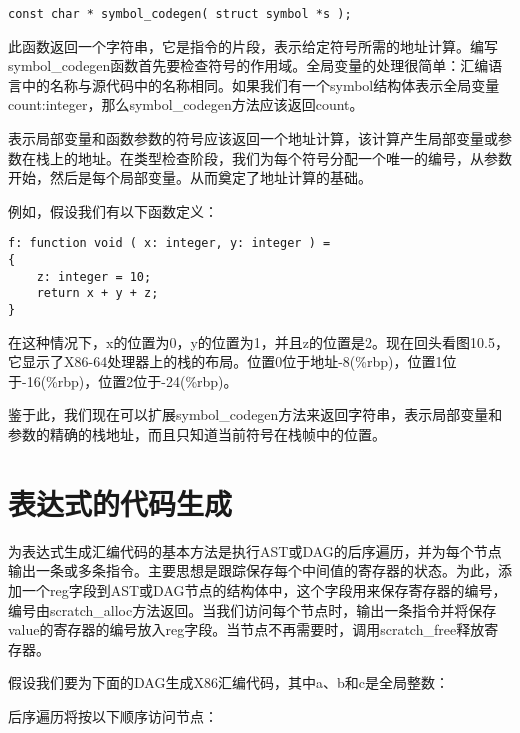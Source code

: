 \documentclass[cn,11pt,chinese]{elegantbook}
\begin{document}
\begin{verbatim}
const char * symbol_codegen( struct symbol *s );
\end{verbatim}

此函数返回一个字符串，它是指令的片段，表示给定符号所需的地址计算。编写symbol\_codegen函数首先要检查符号的作用域。全局变量的处理很简单：汇编语言中的名称与源代码中的名称相同。如果我们有一个symbol结构体表示全局变量count:integer，那么symbol\_codegen方法应该返回count。

表示局部变量和函数参数的符号应该返回一个地址计算，该计算产生局部变量或参数在栈上的地址。在类型检查阶段，我们为每个符号分配一个唯一的编号，从参数开始，然后是每个局部变量。从而奠定了地址计算的基础。

例如，假设我们有以下函数定义：

\begin{verbatim}
f: function void ( x: integer, y: integer ) =
{
    z: integer = 10;
    return x + y + z;
}
\end{verbatim}

在这种情况下，x的位置为0，y的位置为1，并且z的位置是2。现在回头看图10.5，它显示了X86-64处理器上的栈的布局。位置0位于地址-8(\%rbp)，位置1位于-16(\%rbp)，位置2位于-24(\%rbp)。

鉴于此，我们现在可以扩展symbol\_codegen方法来返回字符串，表示局部变量和参数的精确的栈地址，而且只知道当前符号在栈帧中的位置。

\section{表达式的代码生成}

为表达式生成汇编代码的基本方法是执行AST或DAG的后序遍历，并为每个节点输出一条或多条指令。主要思想是跟踪保存每个中间值的寄存器的状态。为此，添加一个reg字段到AST或DAG节点的结构体中，这个字段用来保存寄存器的编号，编号由scratch\_alloc方法返回。当我们访问每个节点时，输出一条指令并将保存value的寄存器的编号放入reg字段。当节点不再需要时，调用scratch\_free释放寄存器。

假设我们要为下面的DAG生成X86汇编代码，其中a、b和c是全局整数：

后序遍历将按以下顺序访问节点：
\end{document}
